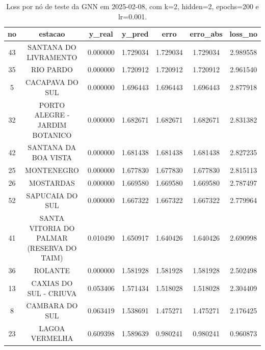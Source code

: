 \begin{table}[h]
\centering
\caption{Loss por nó de teste da GNN em 2025-02-08, com k=2, hidden=2, epochs=200 e lr=0.001.}
\label{tab:gnn_loss_nodes_k2_hidden2}
\begin{tabular}{ccccccc}
\toprule
no & estacao & y\_real & y\_pred & erro & erro\_abs & loss\_no \\
\midrule
43 & SANTANA DO LIVRAMENTO & 0.000000 & 1.729034 & 1.729034 & 1.729034 & 2.989558 \\
35 & RIO PARDO & 0.000000 & 1.720912 & 1.720912 & 1.720912 & 2.961540 \\
5 & CACAPAVA DO SUL & 0.000000 & 1.696443 & 1.696443 & 1.696443 & 2.877918 \\
32 & PORTO ALEGRE - JARDIM BOTANICO & 0.000000 & 1.682671 & 1.682671 & 1.682671 & 2.831382 \\
42 & SANTANA DA BOA VISTA & 0.000000 & 1.681438 & 1.681438 & 1.681438 & 2.827235 \\
25 & MONTENEGRO & 0.000000 & 1.677830 & 1.677830 & 1.677830 & 2.815113 \\
26 & MOSTARDAS & 0.000000 & 1.669580 & 1.669580 & 1.669580 & 2.787497 \\
52 & SAPUCAIA DO SUL & 0.000000 & 1.667322 & 1.667322 & 1.667322 & 2.779964 \\
41 & SANTA VITORIA DO PALMAR (RESERVA DO TAIM) & 0.010490 & 1.650917 & 1.640426 & 1.640426 & 2.690998 \\
36 & ROLANTE & 0.000000 & 1.581928 & 1.581928 & 1.581928 & 2.502498 \\
13 & CAXIAS DO SUL - CRIUVA & 0.053406 & 1.571434 & 1.518028 & 1.518028 & 2.304409 \\
8 & CAMBARA DO SUL & 0.063419 & 1.538691 & 1.475271 & 1.475271 & 2.176425 \\
23 & LAGOA VERMELHA & 0.609398 & 1.589639 & 0.980241 & 0.980241 & 0.960873 \\
\bottomrule
\end{tabular}
\end{table}
